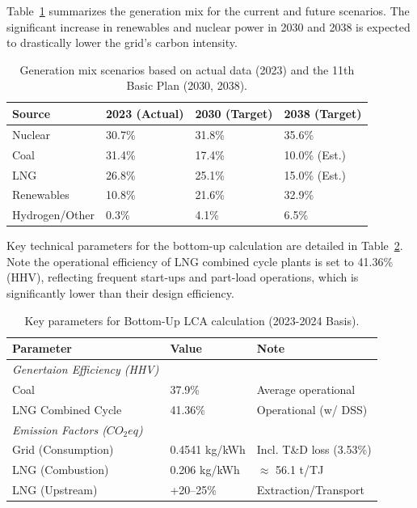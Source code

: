 \documentclass[final,5p,times,twocolumn,authoryear]{elsarticle}
\begin{document}
Table~\ref{tab:grid_scenarios} summarizes the generation mix for the current and future scenarios. The significant increase in renewables and nuclear power in 2030 and 2038 is expected to drastically lower the grid's carbon intensity.

\begin{table}[t]
\centering
\caption{Generation mix scenarios based on actual data (2023) and the 11th Basic Plan (2030, 2038).}
\label{tab:grid_scenarios}
\renewcommand{\arraystretch}{1.2}
\small
\begin{tabularx}{\columnwidth}{l X X X}
\toprule
\textbf{Source} & \textbf{2023 (Actual)} & \textbf{2030 (Target)} & \textbf{2038 (Target)} \\
\midrule
Nuclear & 30.7\% & 31.8\% & 35.6\% \\
Coal & 31.4\% & 17.4\% & 10.0\% (Est.) \\
LNG & 26.8\% & 25.1\% & 15.0\% (Est.) \\
Renewables & 10.8\% & 21.6\% & 32.9\% \\
Hydrogen/Other & 0.3\% & 4.1\% & 6.5\% \\
\bottomrule
\end{tabularx}
\end{table}

Key technical parameters for the bottom-up calculation are detailed in Table~\ref{tab:lca_params}. Note the operational efficiency of LNG combined cycle plants is set to 41.36\% (HHV), reflecting frequent start-ups and part-load operations, which is significantly lower than their design efficiency.

\begin{table}[t]
\centering
\caption{Key parameters for Bottom-Up LCA calculation (2023-2024 Basis).}
\label{tab:lca_params}
\renewcommand{\arraystretch}{1.2}
\small
\begin{tabularx}{\columnwidth}{l X l}
\toprule
\textbf{Parameter} & \textbf{Value} & \textbf{Note} \\
\midrule
\textit{Genertaion Efficiency (HHV)} & & \\
Coal & 37.9\% & Average operational \\
LNG Combined Cycle & 41.36\% & Operational (w/ DSS) \\
\midrule
\textit{Emission Factors ($CO_2eq$)} & & \\
Grid (Consumption) & 0.4541 kg/kWh & Incl. T\&D loss (3.53\%) \\
LNG (Combustion) & 0.206 kg/kWh & $\approx$ 56.1 t/TJ \\
LNG (Upstream) & +20--25\% & Extraction/Transport \\
\bottomrule
\end{tabularx}
\end{table}
\end{document}
